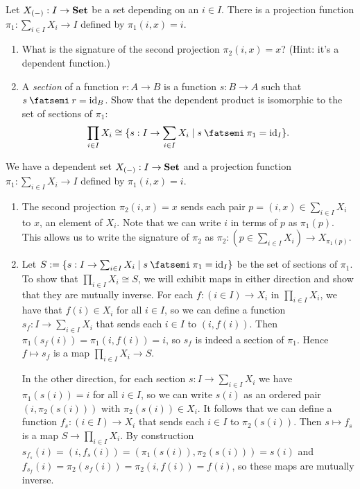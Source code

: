 \documentclass[Book-Poly]{subfiles}
\begin{document}
\begin{exercise}\label{exc.dependent_product_as_sections}
  Let $X_{(-)} : I \to \textbf{Set}$ be a set depending on an $i \in I$. There is a
  projection function
  $\pi_1 : \sum_{i \in I} X_i \to I$
  defined by $\pi_1(i, x) = i$.
  \begin{enumerate}
    \item What is the signature of the second projection $\pi_2(i, x) = x$?
    (Hint: it's a dependent function.)
    \item A \emph{section} of a function $r : A \to B$ is a function $s : B \to A$ such that $s \then r = \id_B$.
    Show that the dependent product is isomorphic to the set of sections of $\pi_1$:
    $$\prod_{i \in I} X_i \cong \{s : I \to \sum_{i \in I} X_i \mid s \then \pi_1 = \id_I\}.$$\qedhere
  \end{enumerate}
\begin{solution}
We have a dependent set $X_{(-)} : I \to \textbf{Set}$ and a projection function $\pi_1 : \sum_{i \in I} X_i \to I$ defined by $\pi_1(i, x) = i$.
\begin{enumerate}
    \item The second projection $\pi_2(i, x) = x$ sends each pair $p = (i, x) \in \sum_{i \in I} X_i$ to $x$, an element of $X_i$.
    Note that we can write $i$ in terms of $p$ as $\pi_1(p)$.
    This allows us to write the signature of $\pi_2$ as $\pi_2 \colon (p \in \sum_{i \in I} X_i) \to X_{\pi_1(p)}$.
    
    \item Let $S := \{s : I \to \sum_{i \in I} X_i \mid s \then \pi_1 = \id_I\}$ be the set of sections of $\pi_1$. To show that $\prod_{i \in I} X_i \cong S$, we will exhibit maps in either direction and show that they are mutually inverse.
    For each $f \colon (i \in I) \to X_i$ in $\prod_{i \in I} X_i$, we have that $f(i) \in X_i$ for all $i \in I$, so we can define a function $s_f \colon I \to \sum_{i \in I} X_i$ that sends each $i \in I$ to $(i, f(i))$.
    Then $\pi_1(s_f(i)) = \pi_1(i, f(i)) = i$, so $s_f$ is indeed a section of $\pi_1$.
    Hence $f \mapsto s_f$ is a map $\prod_{i \in I} X_i \to S$.
    
    In the other direction, for each section $s \colon I \to \sum_{i \in I} X_i$ we have $\pi_1(s(i)) = i$ for all $i \in I$, so we can write $s(i)$ as an ordered pair $(i, \pi_2(s(i)))$ with $\pi_2(s(i)) \in X_i$.
    It follows that we can define a function $f_s \colon (i \in I) \to X_i$ that sends each $i \in I$ to  $\pi_2(s(i))$.
    Then $s \mapsto f_s$ is a map $S \to \prod_{i \in I} X_i$.
    By construction $s_{f_s}(i) = (i, f_s(i)) = (\pi_1(s(i)), \pi_2(s(i))) = s(i)$ and $f_{s_f}(i) = \pi_2(s_f(i)) = \pi_2(i, f(i)) = f(i)$, so these maps are mutually inverse.
\end{enumerate}
\end{solution}
\end{exercise}
\end{document}
